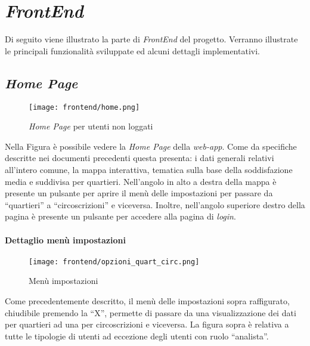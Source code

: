 \chapter{\textit{FrontEnd}}
Di seguito viene illustrato la parte di \textit{FrontEnd} del progetto. Verranno illustrate le principali funzionalità sviluppate ed alcuni dettagli implementativi.

\section{\textit{Home Page}}
    \begin{figure}[H]
        \centering
        \texttt{[image: frontend/home.png]}
        \caption{\textit{Home Page} per utenti non loggati}
        \label{fig:frontend-home}
    \end{figure}
    Nella Figura  è possibile vedere la \textit{Home Page} della \textit{web-app}. Come da specifiche descritte nei documenti precedenti questa presenta: i dati generali relativi all'intero comune, la mappa interattiva, tematica sulla base della soddisfazione media e suddivisa per quartieri. Nell'angolo in alto a destra della mappa è presente un pulsante per aprire il menù delle impostazioni per passare da ``quartieri'' a ``circoscrizioni'' e viceversa. Inoltre, nell'angolo superiore destro della pagina è presente un pulsante per accedere alla pagina di \textit{login}.
    
    \subsubsection{Dettaglio menù impostazioni}
        \begin{figure}[H]
            \centering
            \texttt{[image: frontend/opzioni\_quart\_circ.png]}
            \caption{Menù impostazioni}
            \label{fig:frontend-settings}
        \end{figure}
        Come precedentemente descritto, il menù delle impostazioni sopra raffigurato, chiudibile premendo la ``X'', permette di passare da una visualizzazione dei dati per quartieri ad una per circoscrizioni e viceversa. La figura sopra è relativa a tutte le tipologie di utenti ad eccezione degli utenti con ruolo ``analista''.
\newpage
